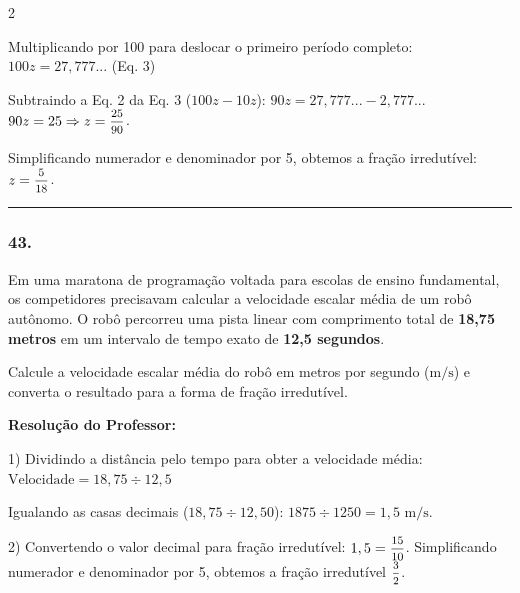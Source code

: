\begin{multicols*}{2}
\begin{tcolorbox}[colback=CorTitUm!5, colframe=CorTitUm, boxrule=1pt, arc=4pt, left=6pt, right=6pt, top=6pt, bottom=6pt]
    Multiplicando por 100 para deslocar o primeiro período completo:
    $100z = 27,777...$ (Eq. 3)
    
    Subtraindo a Eq. 2 da Eq. 3 ($100z - 10z$):
    $90z = 27,777... - 2,777...$
    $90z = 25 \Rightarrow z = \mfrac{25}{90}$.
    
    Simplificando numerador e denominador por 5, obtemos a fração irredutível: $z = \mfrac{5}{18}$.
    \end{tcolorbox}
\fi

\par\vspace{\espacoQuestao}

\noindent\textcolor{CorLinha}{\rule{\linewidth}{0.5pt}} 
\par\vspace{\espacoPreQuestao}
\subsubsection*{43.} Em uma maratona de programação voltada para escolas de ensino fundamental, os competidores precisavam calcular a velocidade escalar média de um robô autônomo. O robô percorreu uma pista linear com comprimento total de \textbf{18,75 metros} em um intervalo de tempo exato de \textbf{12,5 segundos}.

Calcule a velocidade escalar média do robô em metros por segundo ($\text{m/s}$) e converta o resultado para a forma de fração irredutível.

\ifgabarito
    \begin{tcolorbox}[colback=CorTitUm!5, colframe=CorTitUm, boxrule=1pt, arc=4pt, left=6pt, right=6pt, top=6pt, bottom=6pt]
    \small\textbf{\textcolor{CorTitUm}{Resolução do Professor:}}\par\vspace{0.1cm}
    \color{CinzaEscuro}
    1) Dividindo a distância pelo tempo para obter a velocidade média:
    $\text{Velocidade} = 18,75 \div 12,5$
    
    Igualando as casas decimais ($18,75 \div 12,50$):
    $1875 \div 1250 = 1,5\text{ m/s}$.
    
    2) Convertendo o valor decimal para fração irredutível:
    $1,5 = \mfrac{15}{10}$. Simplificando numerador e denominador por 5, obtemos a fração irredutível $\mfrac{3}{2}$.
    \end{tcolorbox}
\fi

\par\vspace{\espacoQuestao}


\end{multicols*}
